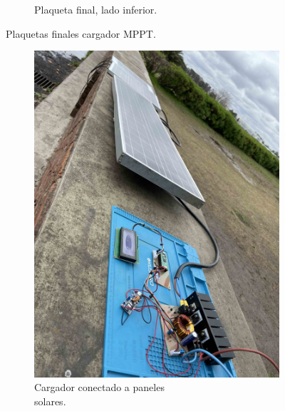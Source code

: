 \begin{figure}[H]
\begin{subfigure}{0.5\textwidth}
        \caption{Plaqueta final, lado inferior.}
        \label{fig:subim2}
    \end{subfigure}
\caption{Plaquetas finales cargador MPPT.}
\end{figure}

\begin{figure}[H]
    \begin{subfigure}{0.5\textwidth}
        \includegraphics[width=0.9\linewidth]{MPPT/IMG_8913.jpg} 
        \caption{Cargador conectado a paneles\\ solares.}
        \label{fig:paneles-solares-MPPT}
    \end{subfigure}
    \begin{subfigure}{0.5\textwidth}

\end{subfigure}
\end{figure}
